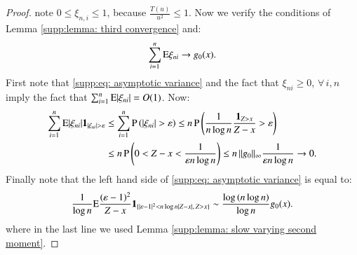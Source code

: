 \begin{proof}
			note $0 \leq \xi_{n,i} \leq 1$, because $\frac{T(u)}{u^2} \leq 1$. Now we verify the conditions of Lemma \ref{supp:lemma: third convergence} and:
			\begin{align}\label{supp:eq: asymptotic variance}
				\sum_{i=1}^n \mathrm{E} \xi_{ni} \rightarrow g_0(x).
			\end{align}
			First note that \eqref{supp:eq: asymptotic variance} and the fact that $\xi_{ni} \geq 0$, $\forall \, i,n$ imply the fact that $\sum_{i=1}^n \mathrm{E} |\xi_{ni}| = O(1)$. Now:
			\begin{align*}
				\sum_{i=1}^{n} \mathrm{E}|\xi_{ni}| \mathbf{1}_{|\xi_{ni}| > \varepsilon} &\leq \sum_{i=1}^{n} \mathrm{P} \left( |\xi_{ni}| > \varepsilon \right) \leq n \, \mathrm{P} \left( \frac{1}{n\log{n}}\frac{\mathbf{1}_{Z>x}}{Z-x} > \varepsilon \right) \\
				&\leq n \, \mathrm{P} \left( 0 < Z-x < \frac{1}{\varepsilon n \log{n}} \right) \leq n \, \| g_0 \|_{\infty} \frac{1}{\varepsilon n \log{n}} \rightarrow 0.
			\end{align*}
			Finally note that the left hand side of \eqref{supp:eq: asymptotic variance} is equal to:
			\begin{align*}
				 \frac{1}{\log{n}} \mathrm{E} \frac{(\varepsilon - 1)^2}{Z-x}  \mathbf{1}_{\{|\varepsilon - 1|^2 < n \log n |Z - x|, \, Z > x\}} \sim \frac{\log{(n \log{n})}}{\log{n}} g_0(x).
			\end{align*}
			where in the last line we used Lemma \ref{supp:lemma: slow varying second moment}. 
	\end{proof}
    
